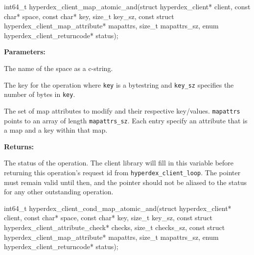 \funcsep
\begin{ccode}
int64_t hyperdex_client_map_atomic_and(struct hyperdex_client* client,
                const char* space,
                const char* key, size_t key_sz,
                const struct hyperdex_client_map_attribute* mapattrs, size_t mapattrs_sz,
                enum hyperdex_client_returncode* status);
\end{ccode}
\funcdesc 

\noindent\textbf{Parameters:}
\begin{description}[labelindent=\widthof{{\texttt{mapattrs}, \texttt{mapattrs\_sz}}},leftmargin=*,noitemsep,nolistsep,align=right]
\item[\texttt{space}] The name of the space as a c-string.
\item[\texttt{key}, \texttt{key\_sz}] The key for the operation where \texttt{key} is a bytestring and \texttt{key\_sz} specifies the number of bytes in \texttt{key}.
\item[\texttt{mapattrs}, \texttt{mapattrs\_sz}] The set of map attributes to modify and their respective key/values.  \texttt{mapattrs} points to an array of length \texttt{mapattrs\_sz}.  Each entry specify an attribute that is a map and a key within that map.
\end{description}

\noindent\textbf{Returns:}
\begin{description}[labelindent=\widthof{{\texttt{status}}},leftmargin=*,noitemsep,nolistsep,align=right]
\item[\texttt{status}] The status of the operation.  The client library will fill in this variable before returning this operation's request id from \texttt{hyperdex\_client\_loop}.  The pointer must remain valid until then, and the pointer should not be aliased to the status for any other outstanding operation.
\end{description}

\funcsep
\begin{ccode}
int64_t hyperdex_client_cond_map_atomic_and(struct hyperdex_client* client,
                const char* space,
                const char* key, size_t key_sz,
                const struct hyperdex_client_attribute_check* checks, size_t checks_sz,
                const struct hyperdex_client_map_attribute* mapattrs, size_t mapattrs_sz,
                enum hyperdex_client_returncode* status);
\end{ccode}
\funcdesc 

